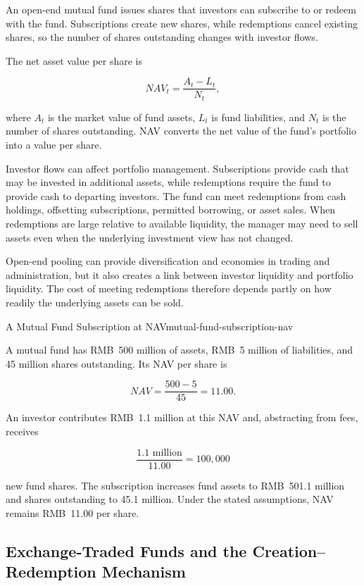 An open-end mutual fund issues shares that investors can subscribe to or redeem with the fund. Subscriptions create new shares, while redemptions cancel existing shares, so the number of shares outstanding changes with investor flows.

The net asset value per share is

\begin{equation}
\textit{NAV}_t=
\frac{A_t-L_t}{N_t},
\label{eq:ch14-nav}
\end{equation}

where $A_t$ is the market value of fund assets, $L_t$ is fund liabilities, and $N_t$ is the number of shares outstanding. NAV converts the net value of the fund's portfolio into a value per share.

Investor flows can affect portfolio management. Subscriptions provide cash that may be invested in additional assets, while redemptions require the fund to provide cash to departing investors. The fund can meet redemptions from cash holdings, offsetting subscriptions, permitted borrowing, or asset sales. When redemptions are large relative to available liquidity, the manager may need to sell assets even when the underlying investment view has not changed.

Open-end pooling can provide diversification and economies in trading and administration, but it also creates a link between investor liquidity and portfolio liquidity. The cost of meeting redemptions therefore depends partly on how readily the underlying assets can be sold.

\begin{example}{A Mutual Fund Subscription at NAV}{mutual-fund-subscription-nav}

A mutual fund has RMB~500 million of assets, RMB~5 million of liabilities, and 45 million shares outstanding. Its NAV per share is

\[
\textit{NAV}=\frac{500-5}{45}=11.00.
\]

An investor contributes RMB~1.1 million at this NAV and, abstracting from fees, receives

\[
\frac{1.1\text{ million}}{11.00}=100{,}000
\]

new fund shares. The subscription increases fund assets to RMB~501.1 million and shares outstanding to 45.1 million. Under the stated assumptions, NAV remains RMB~11.00 per share.

\end{example}

\subsection[Exchange-Traded Funds and the Creation--Redemption Mechanism]{Exchange-Traded Funds and the Creation--\\Redemption Mechanism}

